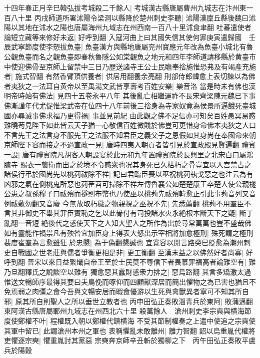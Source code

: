 十四年春正月辛巳韓弘拔考城殺二千餘人|{
	考城漢古縣唐屬曹州九城志在汴州東一百八十里}
丙戌師道所署沭陽令梁洞以縣降於楚州刺史李聽|{
	沭陽漢廩丘縣後魏曰沭陽以其地在沭水之陽也唐屬海州九域志在州西南一百八十里沭食聿翻}
吐蕃遣使者論短立藏等來修好未返|{
	好呼到翻}
入寇河曲上曰其國失信其使何罪庚寅遣歸國　壬辰武寧節度使李愬拔魚臺|{
	魚臺漢方與縣地唐屬兖州寶應元年改為魚臺小城北有魯公觀魚臺而名之觀魚臺即春秋魯隱公如棠觀魚之地元和四年李師道請移縣於黄臺市}
中使迎佛骨至京師上留禁中三日乃歷送諸寺王公士民瞻奉捨施惟恐弗及有竭產充施者|{
	施式智翻}
有然香臂頂供養者|{
	供居用翻養余亮翻}
刑部侍郎韓愈上表切諫以為佛者夷狄之一法耳自黄帝以至禹湯文武皆享壽考百姓安樂|{
	樂音洛}
當是時未有佛也漢明帝時始有佛法|{
	見四十五卷永平八年}
其後亂亡相繼運祚不長宋齊梁陳元魏已下事佛漸謹年代尤促惟梁武帝在位四十八年前後三捨身為寺家奴竟為侯景所逼餓死臺城國亦尋滅事佛求福乃更得禍|{
	事並見前紀}
由此觀之佛不足信亦可知矣百姓愚冥易惑難曉苟見陛下如此皆云天子猶一心敬信百姓微賤於佛豈可更惜身命佛本夷狄之人口不言先王之法言身不服先王之法服不知君臣之義父子之恩假如其身尚在奉國命來朝京師陛下容而接之不過宣政一見|{
	唐時四夷入朝貢者皆引見於宣政殿見賢遍翻}
禮賓一設|{
	唐有禮賓院凡胡客人朝設宴於此元和九年置禮賓院於長興里之北宋白曰屬鴻臚寺}
賜衣一襲衛而出之於境不令惑衆也况其身死已久枯朽之骨豈宜以入宫禁古之諸侯行弔於國尚先以桃茢祓除不祥|{
	記曰君臨臣喪以巫祝桃茢執戈惡之也注云為有凶邪之氣在側桃鬼所惡也茢萑苕可掃除不祥左傳魯襄公如楚楚康王卒楚人使公親襚公患之叔孫穆子曰祓殯而襚則布幣也乃使巫以桃茢先祓殯韓愈正引此事茢音列又音例祓敷勿翻又音廢}
今無故取朽穢之物親視之巫祝不先|{
	先悉薦翻}
桃茢不用羣臣不言其非御史不舉其罪臣實恥之乞以此骨付有司投諸水火永絶根本斷天下之疑|{
	斷丁亂翻一音短}
絶後代之惑使天下之人知大聖人之所作為出於尋常萬萬也豈不盛哉佛如有靈能作禍祟凡有殃咎宜加臣身上得表大怒出示宰相將加愈極刑|{
	殊死謂之極刑}
裴度崔羣為言愈雖狂於忠懇|{
	為于偽翻懇誠也}
宜寛容以開言路癸巳貶愈為潮州刺史自戰國之世老莊與儒者爭衡更相是非|{
	更工衡翻}
至漢末益之以佛然好者尚寡|{
	好呼到翻}
晉宋以來日益繁熾自帝王至於士民莫不尊信下者畏慕罪福高者論難空有|{
	難乃旦翻釋氏之說談空以難有}
獨愈惡其蠧財惑衆力排之|{
	惡烏路翻}
其言多矯激太過惟送文暢師序最得其要曰夫鳥俛而啄仰而四顧獸深居而簡出懼物之為已害也猶且不免焉弱之肉彊之食今吾與文暢安居而暇食優游以生死與禽獸異者寧可不知其所自邪|{
	原其所自則聖人之所以垂世立教者也}
丙申田弘正奏敗淄青兵於東阿|{
	敗蒲邁翻東阿漢古縣唐屬鄆州九域志在州西北六十里}
殺萬餘人　滄州刺史李宗奭與横海節度使鄭權不叶|{
	程權既入朝以鄭權代鎮横海}
不受其節制權奏之上遣中使追之宗奭使其軍中留已|{
	此謂滄州本州之軍也}
表稱懼亂未敢離州|{
	離力智翻}
詔以烏重胤代權將吏懼逐宗奭|{
	懼重胤討其黨惡}
宗奭奔京師辛丑斬於獨柳之下　丙午田弘正奏敗平盧兵於陽穀


